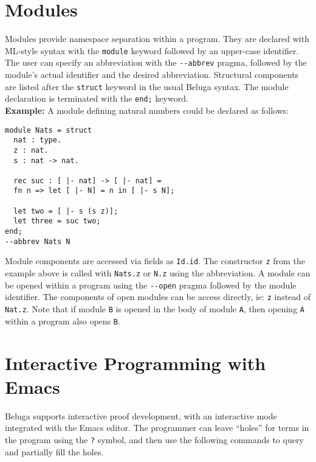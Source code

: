 \documentclass[11pt]{article}
\begin{document}


\section{Modules}
Modules provide namespace separation within a program. They are declared with ML-style syntax with the \texttt{module} keyword followed by an upper-case identifier. The user can specify an abbreviation with the \texttt{-{}-abbrev} pragma, followed by the module's actual identifier and the desired abbreviation. Structural components are listed after the \texttt{struct} keyword in the usual Beluga syntax. The module declaration is terminated with the \texttt{end;} keyword. \\

\textbf{Example:} A module defining natural numbers could be declared as follows:
\begin{verbatim}
module Nats = struct
  nat : type.
  z : nat.
  s : nat -> nat.

  rec suc : [ |- nat] -> [ |- nat] =
  fn n => let [ |- N] = n in [ |- s N];

  let two = [ |- s (s z)];
  let three = suc two;
end;
--abbrev Nats N
\end{verbatim}

Module components are accessed via fields as \texttt{Id.id}. The constructor \texttt{z} from the example above is called with \texttt{Nats.z} or \texttt{N.z} using the abbreviation. A module can be opened within a program using the \texttt{-{}-open} pragma followed by the module identifier. The components of open modules can be access directly, ie: \texttt{z} instead of \texttt{Nat.z}. Note that if module \texttt{B} is opened in the body of module \texttt{A}, then opening \texttt{A} within a program also opens \texttt{B}.


\section{Interactive Programming with Emacs}
Beluga supports interactive proof development, with an interactive mode integrated with the Emacs editor. The programmer can leave ``holes'' for terms in the program using the \texttt{?} symbol, and then use the following commands to query and partially fill the holes.
\end{document}
